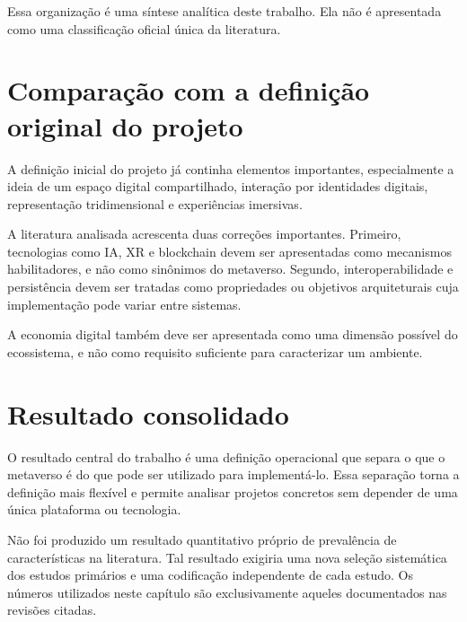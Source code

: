 Essa organização é uma síntese analítica deste trabalho. Ela não é apresentada como uma classificação oficial única da literatura.

\section{Comparação com a definição original do projeto}

A definição inicial do projeto já continha elementos importantes, especialmente a ideia de um espaço digital compartilhado, interação por identidades digitais, representação tridimensional e experiências imersivas.

A literatura analisada acrescenta duas correções importantes. Primeiro, tecnologias como IA, XR e blockchain devem ser apresentadas como mecanismos habilitadores, e não como sinônimos do metaverso. Segundo, interoperabilidade e persistência devem ser tratadas como propriedades ou objetivos arquiteturais cuja implementação pode variar entre sistemas.

A economia digital também deve ser apresentada como uma dimensão possível do ecossistema, e não como requisito suficiente para caracterizar um ambiente.

\section{Resultado consolidado}

O resultado central do trabalho é uma definição operacional que separa o que o metaverso é do que pode ser utilizado para implementá-lo. Essa separação torna a definição mais flexível e permite analisar projetos concretos sem depender de uma única plataforma ou tecnologia.

Não foi produzido um resultado quantitativo próprio de prevalência de características na literatura. Tal resultado exigiria uma nova seleção sistemática dos estudos primários e uma codificação independente de cada estudo. Os números utilizados neste capítulo são exclusivamente aqueles documentados nas revisões citadas.
